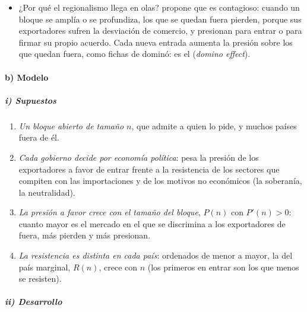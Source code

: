 \documentclass[11pt]{article}
\begin{document}
\begin{itemize}
\item ¿Por qué el regionalismo llega en olas? \textcite{Baldwin1993Domino} propone que es contagioso: cuando un bloque se amplía o se profundiza, los que se quedan fuera pierden, porque sus exportadores sufren la desviación de comercio, y presionan para entrar o para firmar su propio acuerdo. Cada nueva entrada aumenta la presión sobre los que quedan fuera, como fichas de dominó: es el  (\emph{domino effect})\nocite{Baldwin1995Domino}.
\end{itemize}

\paragraph{b) Modelo}

\subparagraph{i) Supuestos}

\begin{enumerate}
\item \emph{Un bloque abierto de tamaño $n$}, que admite a quien lo pide, y muchos países fuera de él.
\item \emph{Cada gobierno decide por economía política}: pesa la presión de los exportadores a favor de entrar frente a la resistencia de los sectores que compiten con las importaciones y de los motivos no económicos (la soberanía, la neutralidad).
\item \emph{La presión a favor crece con el tamaño del bloque}, $P(n)$ con $P'(n)>0$: cuanto mayor es el mercado en el que se discrimina a los exportadores de fuera, más pierden y más presionan.
\item \emph{La resistencia es distinta en cada país}: ordenados de menor a mayor, la del país marginal, $R(n)$, crece con $n$ (los primeros en entrar son los que menos se resisten).
\end{enumerate}

\subparagraph{ii) Desarrollo}
\end{document}
